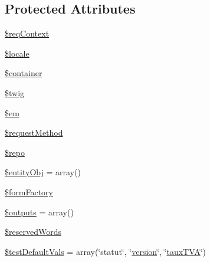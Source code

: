 \subsection*{Protected Attributes}
\begin{DoxyCompactItemize}
\item 
\hyperlink{class_acme_group_1_1_labo_bundle_1_1event_listeners_1_1session_data_1_1out_puts3_aee135bf672a6f1292bd455a2db1f408a}{\$req\+Context}
\item 
\hyperlink{class_acme_group_1_1_labo_bundle_1_1event_listeners_1_1session_data_1_1out_puts3_ab497133696eebeb2eadff27d2e67f62d}{\$locale}
\item 
\hyperlink{class_acme_group_1_1_labo_bundle_1_1event_listeners_1_1session_data_1_1out_puts3_aeae1a8946619c236313e4ff1afd32bcc}{\$container}
\item 
\hyperlink{class_acme_group_1_1_labo_bundle_1_1event_listeners_1_1session_data_1_1out_puts3_a85219aea4aa7c797e11603fc3976a265}{\$twig}
\item 
\hyperlink{class_acme_group_1_1_labo_bundle_1_1event_listeners_1_1session_data_1_1out_puts3_afd7a45ebc89c1f689c48754c137d8d53}{\$em}
\item 
\hyperlink{class_acme_group_1_1_labo_bundle_1_1event_listeners_1_1session_data_1_1out_puts3_a030b3a20ba66f7ba9dff28350f964ae4}{\$request\+Method}
\item 
\hyperlink{class_acme_group_1_1_labo_bundle_1_1event_listeners_1_1session_data_1_1out_puts3_a633a1b05a60e1a14a92e896520e35874}{\$repo}
\item 
\hyperlink{class_acme_group_1_1_labo_bundle_1_1event_listeners_1_1session_data_1_1out_puts3_a9b71e52c422fc64127fa2216c2651be1}{\$entity\+Obj} = array()
\item 
\hyperlink{class_acme_group_1_1_labo_bundle_1_1event_listeners_1_1session_data_1_1out_puts3_af4c33f4f8e815a90509b3ce41535fcd2}{\$form\+Factory}
\item 
\hyperlink{class_acme_group_1_1_labo_bundle_1_1event_listeners_1_1session_data_1_1out_puts3_a10d678efcf65eef06eee437d1feef82e}{\$outputs} = array()
\item 
\hyperlink{class_acme_group_1_1_labo_bundle_1_1event_listeners_1_1session_data_1_1out_puts3_a2f3fe4080c8e9cd1c86bfccebdc24803}{\$reserved\+Words}
\item 
\hyperlink{class_acme_group_1_1_labo_bundle_1_1event_listeners_1_1session_data_1_1out_puts3_a54fe0e9a54a3ef7489c1d4e5df4024a4}{\$test\+Default\+Vals} = array(\char`\"{}statut\char`\"{}, \char`\"{}\hyperlink{class_acme_group_1_1_labo_bundle_1_1_entity_1_1version}{version}\char`\"{}, \char`\"{}\hyperlink{class_acme_group_1_1_labo_bundle_1_1_entity_1_1taux_t_v_a}{taux\+T\+V\+A}\char`\"{})
\end{DoxyCompactItemize}



